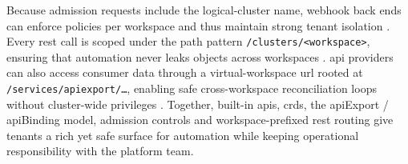\documentclass[11pt, a4paper, oneside, listof=totoc]{scrartcl}
\begin{document}
                Because admission requests include the logical-cluster name, webhook back ends can
                enforce policies per workspace and thus maintain strong tenant isolation
                \parencite{kcpAuthorization}.
                Every \gls{rest} call is scoped under the path pattern
                \texttt{/clusters/<workspace>}, ensuring that automation never leaks objects across
                workspaces \parencite{kcpAPIsREST}.
                \gls{api} providers can also access consumer data through a virtual-workspace
                \gls{url} rooted at \texttt{/services/apiexport/…}, enabling safe cross-workspace
                reconciliation loops without cluster-wide privileges \parencite{kcpAPIsREST}.
                Together, built-in \glspl{api}, \glspl{crd}, the \gls{api}Export / \gls{api}Binding
                model, admission controls and workspace-prefixed \gls{rest} routing give tenants a
                rich yet safe surface for automation while keeping operational responsibility with
                the platform team.
\end{document}
